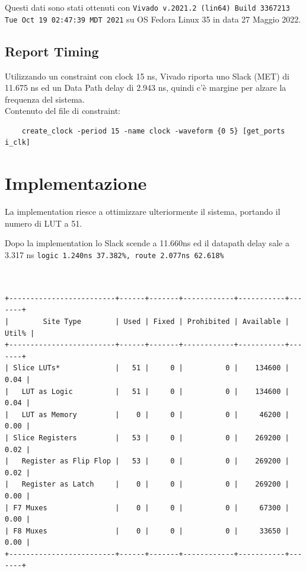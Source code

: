 \documentclass[12pt, a4paper]{article}
\begin{document}
\noindent Questi dati sono stati ottenuti con \texttt{Vivado v.2021.2 (lin64) Build 3367213 Tue Oct 19 02:47:39 MDT 2021} su OS Fedora Linux 35 in data 27 Maggio 2022.\\

\subsection{Report Timing}

Utilizzando un constraint con clock 15 ns, Vivado riporta
uno Slack (MET) di 11.675 ns ed un Data Path delay di 2.943 ns, quindi c'è margine per
alzare la frequenza del sistema.
\\

\noindent Contenuto del file di constraint:
\begin{verbatim}
    create_clock -period 15 -name clock -waveform {0 5} [get_ports i_clk]
\end{verbatim}

\pagebreak

\section{Implementazione}

La implementation riesce a ottimizzare ulteriormente il sistema, portando il numero di LUT a 51.

\noindent Dopo la implementation lo Slack scende a 11.660ns ed il datapath delay sale a 3.317 ns \texttt{logic 1.240ns 37.382\%, route 2.077ns 62.618\%}

\begin{verbatim}
    

+-------------------------+------+-------+------------+-----------+-------+
|        Site Type        | Used | Fixed | Prohibited | Available | Util% |
+-------------------------+------+-------+------------+-----------+-------+
| Slice LUTs*             |   51 |     0 |          0 |    134600 |  0.04 |
|   LUT as Logic          |   51 |     0 |          0 |    134600 |  0.04 |
|   LUT as Memory         |    0 |     0 |          0 |     46200 |  0.00 |
| Slice Registers         |   53 |     0 |          0 |    269200 |  0.02 |
|   Register as Flip Flop |   53 |     0 |          0 |    269200 |  0.02 |
|   Register as Latch     |    0 |     0 |          0 |    269200 |  0.00 |
| F7 Muxes                |    0 |     0 |          0 |     67300 |  0.00 |
| F8 Muxes                |    0 |     0 |          0 |     33650 |  0.00 |
+-------------------------+------+-------+------------+-----------+-------+
    
    \end{verbatim}
\end{document}
